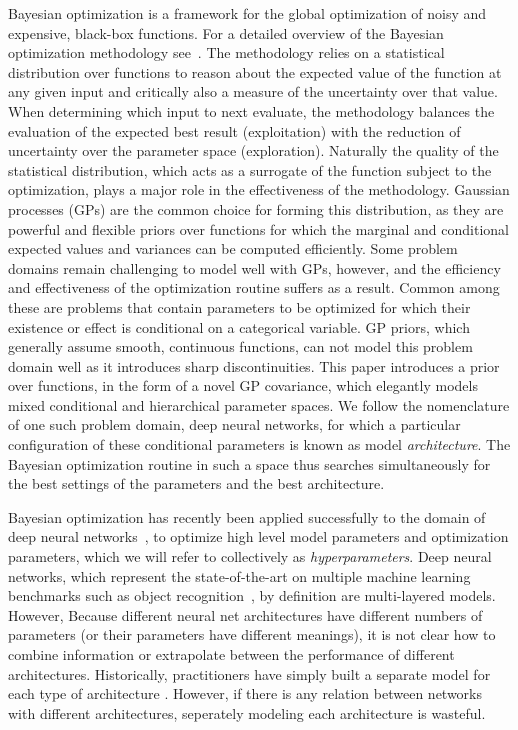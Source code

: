 \documentclass{article}
\begin{document}
Bayesian optimization is a framework for the global optimization of noisy and expensive, black-box functions.  For a detailed overview of the Bayesian optimization methodology see~\cite{Brochu2010}. The methodology relies on a statistical distribution over functions to reason about the expected value of the function at any given input and critically also a measure of the uncertainty over that value.  When determining which input to next evaluate, the methodology balances the evaluation of the expected best result (exploitation) with the reduction of uncertainty over the parameter space (exploration).  Naturally the quality of the statistical distribution, which acts as a surrogate of the function subject to the optimization, plays a major role in the effectiveness of the methodology.  Gaussian processes (GPs) are the common choice for forming this distribution, as they are powerful and flexible priors over functions for which the marginal and conditional expected values and variances can be computed efficiently.  Some problem domains remain challenging to model well with GPs, however, and the efficiency and effectiveness of the optimization routine suffers as a result.  Common among these are problems that contain parameters to be optimized for which their existence or effect is conditional on a categorical variable.  GP priors, which generally assume smooth, continuous functions, can not model this problem domain well as it introduces sharp discontinuities.  This paper introduces a prior over functions, in the form of a novel GP covariance, which elegantly models mixed conditional and hierarchical parameter spaces.  We follow the nomenclature of one such problem domain, deep neural networks, for which a particular configuration of these conditional parameters is known as model \emph{architecture}.  The Bayesian optimization routine in such a space thus searches simultaneously for the best settings of the parameters and the best architecture.

Bayesian optimization has recently been applied successfully to the domain of deep neural networks~\cite{snoek-etal-2012b, BergstraJ2011}, to optimize high level model parameters and optimization parameters, which we will refer to collectively as \emph{hyperparameters}.  Deep neural networks, which represent the state-of-the-art on multiple machine learning benchmarks such as object recognition~\cite{krizhevsky-2012}, by definition are multi-layered models.  However, 
Because different neural net architectures have different numbers of parameters (or their parameters have different meanings), it is not clear how to combine information or extrapolate between the performance of different architectures.
Historically, practitioners have simply built a separate model for each type of architecture \cite{bergstra2011algorithms}.  However, if there is any relation between networks with different architectures, seperately modeling each architecture is wasteful.
\end{document}
